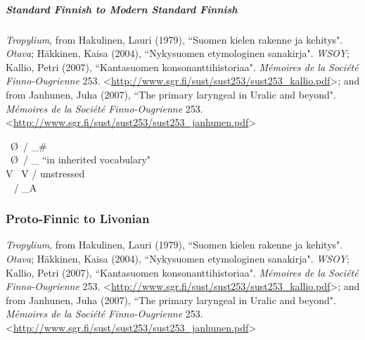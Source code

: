 \documentclass[11pt]{article}
\newcommand{\ipa}{\textipa}
\newcommand{\change}{\textrightarrow}
\begin{document}
\subparagraph{Standard Finnish to Modern Standard Finnish}{\it Tropylium}, from Hakulinen, Lauri (1979), ``Suomen kielen rakenne ja kehitys". {\it Otava}; H\"{a}kkinen, Kaisa (2004), ``Nykysuomen etymologinen sanakirja". {\it WSOY}; Kallio, Petri (2007), ``Kantasuomen konsonanttihistoriaa". {\it M\'{e}moires de la Soci\'{e}t\'{e} Finno-Ougrienne} 253. \textless\url{http://www.sgr.fi/sust/sust253/sust253_kallio.pdf}\textgreater; and from Janhunen, Juha (2007), ``The primary laryngeal in Uralic and beyond". {\it M\'{e}moires de la Soci\'{e}t\'{e} Finno-Ougrienne} 253. \textless\url{http://www.sgr.fi/sust/sust253/sust253_janhunen.pdf}\textgreater

\ipa{n} \change\ \O\ / _\#\\
\ipa{d} \change\ \O\ / _\ipa{r} ``in inherited vocabulary"\\
V\ipa{a} \change\ V\ipa{:} / unstressed\\
\ipa{ie y7 uo} \change\ \ipa{i: y: u:} / _A

\subsubsection{Proto-Finnic to Livonian}{\it Tropylium}, from Hakulinen, Lauri (1979), ``Suomen kielen rakenne ja kehitys". {\it Otava}; H\"{a}kkinen, Kaisa (2004), ``Nykysuomen etymologinen sanakirja". {\it WSOY}; Kallio, Petri (2007), ``Kantasuomen konsonanttihistoriaa". {\it M\'{e}moires de la Soci\'{e}t\'{e} Finno-Ougrienne} 253. \textless\url{http://www.sgr.fi/sust/sust253/sust253_kallio.pdf}\textgreater; and from Janhunen, Juha (2007), ``The primary laryngeal in Uralic and beyond". {\it M\'{e}moires de la Soci\'{e}t\'{e} Finno-Ougrienne} 253. \textless\url{http://www.sgr.fi/sust/sust253/sust253_janhunen.pdf}\textgreater
\end{document}
